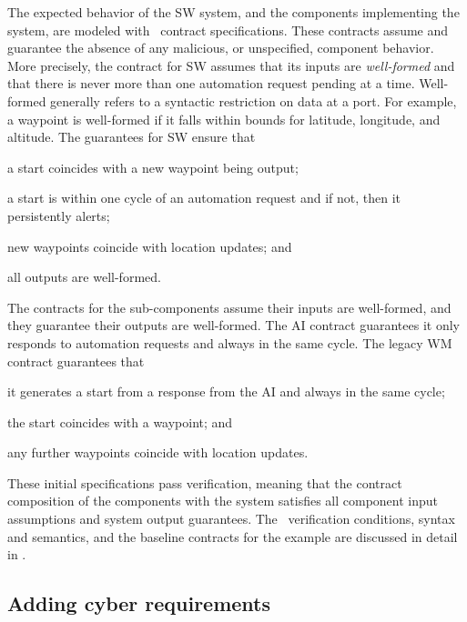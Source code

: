 
The expected behavior of the SW system, and the components
implementing the system, are modeled with \agr\ contract
specifications.
These contracts assume and guarantee the absence
of any malicious, or unspecified, component behavior.  More precisely,
the contract for SW assumes that its inputs are \emph{well-formed} and that
there is never more than one automation request pending at a time.
Well-formed generally refers to a syntactic restriction on
data at a port. For example, a waypoint is well-formed if it falls
within bounds for latitude, longitude, and altitude.  The guarantees
for SW ensure that
\begin{compactitem}
\item a start coincides with a new waypoint being output;
\item a start is within one cycle of an automation request and if not, then it persistently alerts;
\item new waypoints coincide with location updates; and
\item all outputs are well-formed.
\end{compactitem}

The contracts for the sub-components assume their inputs are
well-formed, and they guarantee their outputs are well-formed.  The AI
contract guarantees it only responds to automation requests and always
in the same cycle.  The legacy WM contract guarantees that
\begin{compactitem}
  \item it generates a start from a response from the AI and always in the same cycle;
  \item the start coincides with a waypoint; and
  \item any further waypoints coincide with location updates.
\end{compactitem}

These initial specifications pass verification, meaning that the
contract composition of the components with the system satisfies all
component input assumptions and system output guarantees.
The \agr\ verification conditions, syntax and semantics, and the baseline contracts for the example are discussed in detail in .

\subsection{Adding cyber requirements}

